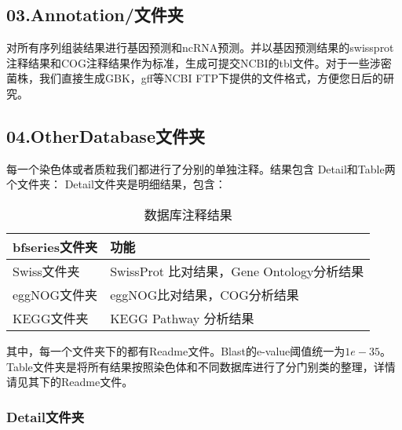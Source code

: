 \subsection{03.Annotation/文件夹}
对所有序列组装结果进行基因预测和ncRNA预测。并以基因预测结果的swissprot注释结果和COG注释结果作为标准，生成可提交NCBI的tbl文件。对于一些涉密菌株，我们直接生成GBK，gff等NCBI FTP下提供的文件格式，方便您日后的研究。
\subsection{04.OtherDatabase文件夹}
每一个染色体或者质粒我们都进行了分别的单独注释。结果包含
Detail和Table两个文件夹：
Detail文件夹是明细结果，包含：

\begin{table}[H]
    \caption{数据库注释结果}
        \begin{center}
            \begin{threeparttable}
                \begin{tabularx}{\textwidth}{XX}

                    \toprule
                    bfseries{文件夹}&\bfseries{功能}\\
                    \midrule
                    Swiss文件夹&SwissProt 比对结果，Gene Ontology分析结果\\
                    eggNOG文件夹&eggNOG比对结果，COG分析结果\\
                    KEGG文件夹&KEGG Pathway 分析结果\\
                    \bottomrule

                \end{tabularx}

            \end{threeparttable}
        \end{center}
\end{table}
其中，每一个文件夹下的都有Readme文件。Blast的e-value阈值统一为$1e-35$。
Table文件夹是将所有结果按照染色体和不同数据库进行了分门别类的整理，详情请见其下的Readme文件。
\subsubsection{Detail文件夹}

